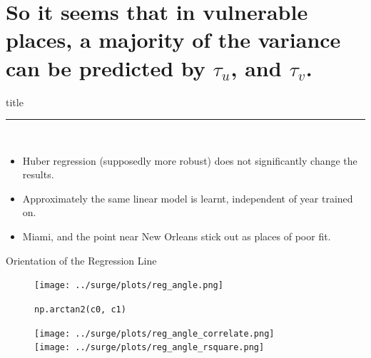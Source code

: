 \documentclass[usenames, dvipsnames]{beamer}
\begin{document}
\section{So it seems that in vulnerable places,
         a  majority of the variance can be predicted by $\tau_u$, and $\tau_v$.}
    \begin{frame}[plain]
        \vfill
      \centering
      \begin{beamercolorbox}[sep=8pt,center,shadow=true,rounded=true]{title}
        \insertsectionhead\par%
        \color{oxfordblue}\noindent\rule{10cm}{1pt} \\
        \begin{itemize}
        \item Huber regression (supposedly more robust) does not significantly change the results.
        \item Approximately the same linear model is learnt, independent of year trained on.
        \item Miami, and the point near New Orleans stick out as places of poor fit.
        \end{itemize}
      \end{beamercolorbox}
      \vfill
  \end{frame}


  \begin{frame}{Orientation of the Regression Line}
\vspace{-30pt}
\hspace{-30pt}
 \begin{minipage}{1.1\textwidth}
 \begin{minipage}{0.7\textwidth}
\begin{figure}
   \hspace{-40pt} \texttt{[image: ../surge/plots/reg\_angle.png]}
    \vspace{-15pt}
   \caption{\texttt{np.arctan2(c0, c1)}}
    \label{fig:A}
\end{figure}
\end{minipage}
 \begin{minipage}{0.28\textwidth}
\begin{figure}[htb!]
        \vspace{-25pt}
   \hspace{-40pt} \texttt{[image: ../surge/plots/reg\_angle\_correlate.png]}\\
    \hspace{-40pt} \texttt{[image: ../surge/plots/reg\_angle\_rsquare.png]}
\end{figure}
\end{minipage}
\end{minipage}
\end{frame}
\end{document}
